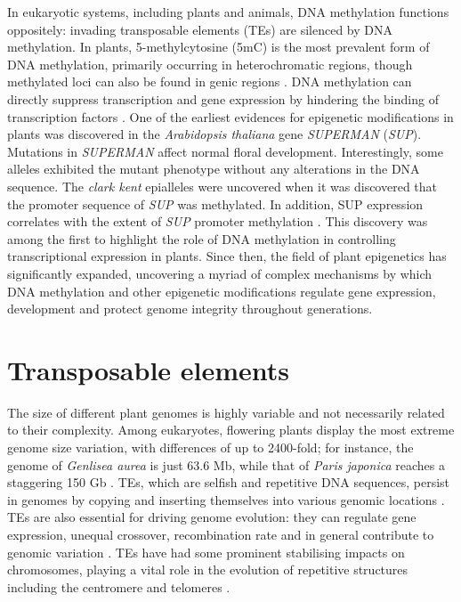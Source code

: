 In eukaryotic systems, including plants and animals, DNA methylation functions oppositely: invading transposable elements (TEs) are silenced by DNA methylation. In plants, 5-methylcytosine (5mC) is the most prevalent form of DNA methylation, primarily occurring in heterochromatic regions, though methylated loci can also be found in genic regions \citep{RN228,RN193}. DNA methylation can directly suppress transcription and gene expression by hindering the binding of transcription factors \citep{RN290}. One of the earliest evidences for epigenetic modifications in plants was discovered in the \textit{Arabidopsis thaliana} gene \textit{SUPERMAN} (\textit{SUP}). Mutations in \textit{SUPERMAN} affect normal floral development. Interestingly, some alleles exhibited the mutant phenotype without any alterations in the DNA sequence. The \textit{clark kent} epialleles were uncovered when it was discovered that the promoter sequence of \textit{SUP} was methylated. In addition, SUP expression correlates with the extent of \textit{SUP} promoter methylation \citep{RN100}. This discovery was among the first to highlight the role of DNA methylation in controlling transcriptional expression in plants. Since then, the field of plant epigenetics has significantly expanded, uncovering a myriad of complex mechanisms by which DNA methylation and other epigenetic modifications regulate gene expression, development and protect genome integrity throughout generations.

\section{Transposable elements} %

The size of different plant genomes is highly variable and not necessarily related to their complexity. Among eukaryotes, flowering plants display the most extreme genome size variation, with differences of up to 2400-fold; for instance, the genome of \textit{Genlisea aurea} is just 63.6 Mb, while that of \textit{Paris japonica} reaches a staggering 150 Gb \citep{RN76,RN81}. TEs, which are selfish and repetitive DNA sequences, persist in genomes by copying and inserting themselves into various genomic locations \citep{RN102}. TEs are also essential for driving genome evolution: they can regulate gene expression, unequal crossover, recombination rate and in general contribute to genomic variation \citep{RN103}. TEs have had some prominent stabilising impacts on  chromosomes, playing a vital role in the evolution  of repetitive structures including the centromere  and telomeres \citep{RN101}.

